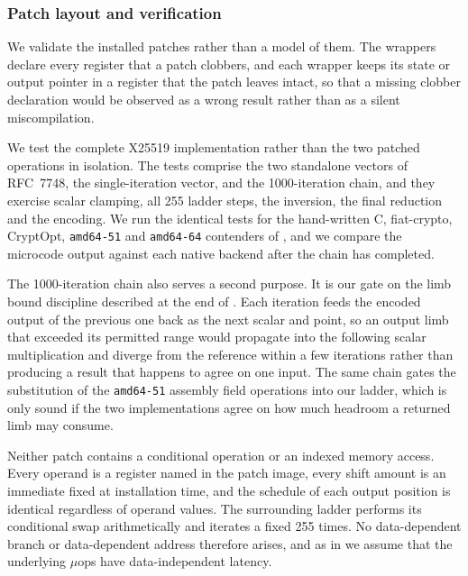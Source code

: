\subsubsection{Patch layout and verification}
\label{sec:c25519-verification}

We validate the installed patches rather than a model of them.
The wrappers declare every register that a patch clobbers, and each wrapper keeps
its state or output pointer in a register that the patch leaves intact, so that a
missing clobber declaration would be observed as a wrong result rather than as a
silent miscompilation.

We test the complete X25519 implementation rather than the two patched operations
in isolation.
The tests comprise the two standalone vectors of RFC~7748, the single-iteration
vector, and the 1000-iteration chain, and they exercise scalar clamping, all 255
ladder steps, the inversion, the final reduction and the encoding.
We run the identical tests for the hand-written C, fiat-crypto, CryptOpt,
\texttt{amd64-51} and \texttt{amd64-64} contenders of , and we
compare the microcode output against each native backend after the chain has
completed.

The 1000-iteration chain also serves a second purpose.
It is our gate on the limb bound discipline described at the end of
.
Each iteration feeds the encoded output of the previous one back as the next scalar
and point, so an output limb that exceeded its permitted range would propagate into
the following scalar multiplication and diverge from the reference within a few
iterations rather than producing a result that happens to agree on one input.
The same chain gates the substitution of the \texttt{amd64-51} assembly field
operations into our ladder, which is only sound if the two implementations agree on
how much headroom a returned limb may consume.

Neither patch contains a conditional operation or an indexed memory access.
Every operand is a register named in the patch image, every shift amount is an
immediate fixed at installation time, and the schedule of each output position is
identical regardless of operand values.
The surrounding ladder performs its conditional swap arithmetically and iterates a
fixed 255 times.
No data-dependent branch or data-dependent address therefore arises, and as in
 we assume that the underlying $\mu$ops have data-independent
latency.
